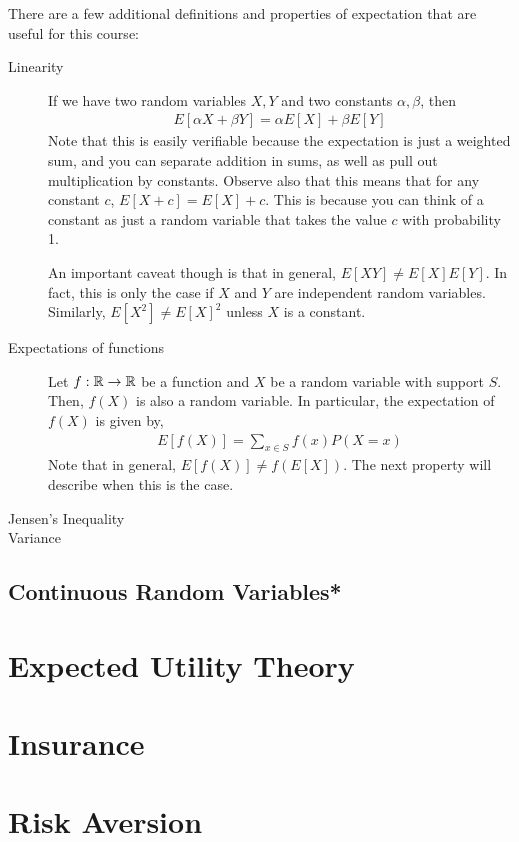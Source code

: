 There are a few additional definitions and properties of expectation that are useful for this course:
\begin{description}
    \item[Linearity] If we have two random variables $X, Y$ and two constants $\alpha, \beta$, then 
    \begin{align*}
        E[\alpha X + \beta Y] = \alpha E[X] + \beta E[Y]
    \end{align*} 
    Note that this is easily verifiable because the expectation is just a weighted sum, and you can separate addition in sums, as well as pull out multiplication by constants. Observe also that this means that for any constant $c$, $E[X + c] = E[X] + c$. This is because you can think of a constant as just a random variable that takes the value $c$ with probability 1. 

    An important caveat though is that in general, $E[XY] \neq E[X]E[Y]$. In fact, this is only the case if $X$ and $Y$ are independent random variables. Similarly, $E[X^2] \neq E[X]^2$ unless $X$ is a constant.

    \item[Expectations of functions] Let $f: \mathbb{R} \to \mathbb{R}$ be a function and $X$ be a random variable with support $S$. Then, $f(X)$ is also a random variable. In particular, the expectation of $f(X)$ is given by,
    \begin{align*}
        E[f(X)] = \sum_{x \in S} f(x) P(X = x)
    \end{align*} 
    Note that in general, $E[f(X)] \neq f(E[X])$. The next property will describe when this is the case.
    \item[Jensen's Inequality]
    \item[Variance] 
\end{description}

\subsection*{Continuous Random Variables*}

\section{Expected Utility Theory}

\section{Insurance}

\section{Risk Aversion}